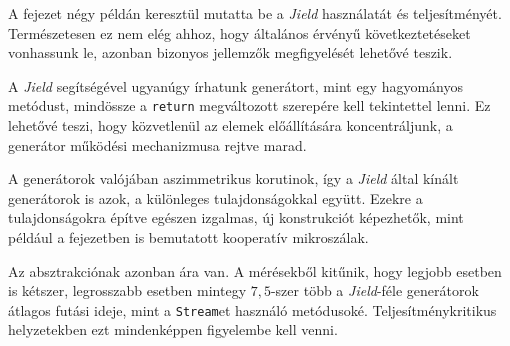 A fejezet négy példán keresztül mutatta be a \textit{Jield} használatát és teljesítményét. Természetesen ez nem elég ahhoz, hogy általános érvényű következtetéseket vonhassunk le, azonban bizonyos jellemzők megfigyelését lehetővé teszik.

A \textit{Jield} segítségével ugyanúgy írhatunk generátort, mint egy hagyományos metódust, mindössze a \texttt{return} megváltozott szerepére kell tekintettel lenni. Ez lehetővé teszi, hogy közvetlenül az elemek előállítására koncentráljunk, a generátor működési mechanizmusa rejtve marad.

A generátorok valójában aszimmetrikus korutinok, így a \textit{Jield} által kínált generátorok is azok, a különleges tulajdonságokkal együtt. Ezekre a tulajdonságokra építve egészen izgalmas, új konstrukciót képezhetők, mint például a fejezetben is bemutatott kooperatív mikroszálak.

Az absztrakciónak azonban ára van. A mérésekből kitűnik, hogy legjobb esetben is kétszer, legrosszabb esetben mintegy $7,5$-szer több a \textit{Jield}-féle generátorok átlagos futási ideje, mint a \texttt{Stream}et használó metódusoké. Teljesítménykritikus helyzetekben ezt mindenképpen figyelembe kell venni.
